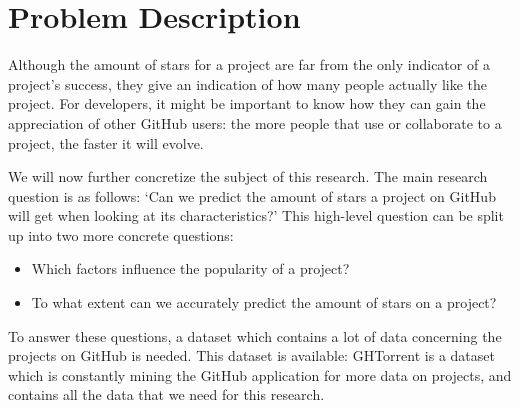 \section{Problem Description}
    Although the amount of stars for a project are far from the only indicator of a project's success, they give an indication of how many people actually like the project.
    For developers, it might be important to know how they can gain the appreciation of other GitHub users: the more people that use or collaborate to a project, the faster it will evolve.

    We will now further concretize the subject of this research. 
    The main research question is as follows: `Can we predict the amount of stars a project on GitHub will get when looking at its characteristics?'
    This high-level question can be split up into two more concrete questions:
    \begin{itemize}
        \item Which factors influence the popularity of a project?
        \item To what extent can we accurately predict the amount of stars on a project?
    \end{itemize}
    
    To answer these questions, a dataset which contains a lot of data concerning the projects on GitHub is needed. 
    This dataset is available: GHTorrent \cite{gousios-2013} is a dataset which is constantly mining the GitHub application for more data on projects, and contains all the data that we need for this research.


